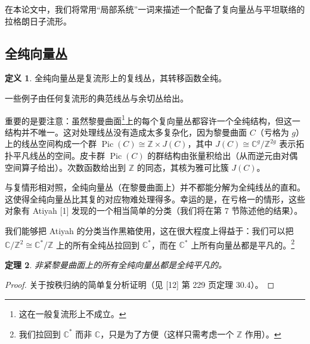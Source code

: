 \documentclass[11pt,a4paper]{article}
\theoremstyle{plain}
\newtheorem{theorem}{定理}[section]
\theoremstyle{definition}
\newtheorem{definition}[theorem]{定义}
\begin{document}

在本论文中，我们将常用“局部系统”一词来描述一个配备了复向量丛与平坦联络的拉格朗日子流形。

\subsection{全纯向量丛}

\begin{definition}
全纯向量丛是复流形上的复线丛，其转移函数全纯。
\end{definition}


一些例子由任何复流形的典范线丛与余切丛给出。

重要的是要注意：虽然黎曼曲面\footnote{这在一般复流形上不成立。}上的每个复向量丛都容许一个全纯结构，但这一结构并不唯一。这对处理线丛没有造成太多复杂化，因为黎曼曲面 $C$（亏格为 $g$）上的线丛空间构成一个群 $\operatorname{Pic}(C)\cong\mathbb{Z}\times J(C)$，其中 $J(C)\cong\mathbb{C}^g/\mathbb{Z}^{2g}$ 表示拓扑平凡线丛的空间。皮卡群 $\operatorname{Pic}(C)$ 的群结构由张量积给出（从而逆元由对偶空间算子给出）。次数函数给出到 $\mathbb{Z}$ 的同态，其核为雅可比簇 $J(C)$。

与复情形相对照，全纯向量丛（在黎曼曲面上）并不都能分解为全纯线丛的直和。这使得全纯向量丛比其复的对应物难处理得多。幸运的是，在亏格一的情形，这些对象有 Atiyah [1] 发现的一个相当简单的分类（我们将在第 7 节陈述他的结果）。

我们能够把 Atiyah 的分类当作黑箱使用，这在很大程度上得益于：我们可以把 $\mathbb{C}/\mathbb{Z}^2\cong\mathbb{C}^*/\mathbb{Z}$ 上的所有全纯丛拉回到 $\mathbb{C}^*$，而在 $\mathbb{C}^*$ 上所有向量丛都是平凡的。\footnote{我们拉回到 $\mathbb{C}^*$ 而非 $\mathbb{C}$，只是为了方便（这样只需考虑一个 $\mathbb{Z}$ 作用）。}

\begin{theorem}
非紧黎曼曲面上的所有全纯向量丛都是全纯平凡的。
\end{theorem}
\begin{proof}
关于按秩归纳的简单复分析证明（见 [12] 第 229 页定理 30.4）。
\end{proof}
\end{document}
